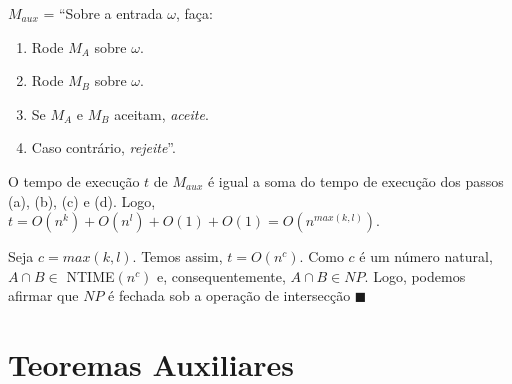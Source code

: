 \documentclass[12pt,a4paper,oneside]{article}
\begin{document}
\begin{enumerate}
{			$M_{aux}$ = ``Sobre a entrada $\omega$, faça:
			\begin{enumerate}
				\item Rode $M_A$ sobre $\omega$.
				\item Rode $M_B$ sobre $\omega$.
				\item Se $M_A$ e $M_B$ aceitam, {\it aceite}.
				\item Caso contrário, {\it rejeite}''.
			\end{enumerate}
			
			O tempo de execução $t$ de $M_{aux}$ é igual a soma do tempo de execução dos passos (a), (b), (c) e (d). Logo, $t = O(n^k) + O(n^l) + O(1) + O(1) = O(n^{max(k,l)})$. 
			
			Seja  $c = max(k,l)$. Temos assim, $t = O(n^c)$. Como $c$ é um número natural, $A \cap B \in$ {\sc NTIME}$(n^c)$ e, consequentemente, $A \cap B \in NP$. Logo, podemos afirmar que $NP$ é fechada sob a operação de intersecção $\blacksquare$
	}
	
\end{enumerate}

\section*{Teoremas Auxiliares}
\end{document}
